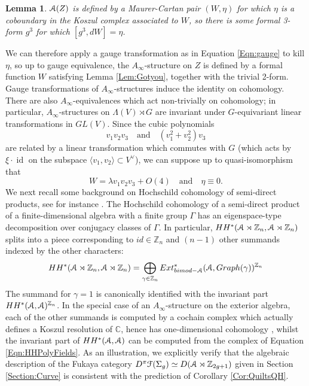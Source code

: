 \documentclass[reqno,10pt]{amsart}
\numberwithin{equation}{section}
\newcommand{\bC}{{\mathbb C}}
\newcommand{\bZ}{{\mathbb Z}}
\newcommand{\scrF}{\EuScript{F}}
\newcommand{\scrA}{\EuScript{A}}
\newcommand{\id}{\operatorname{id}}
\newtheorem{Lemma}[thm]{Lemma}
\theoremstyle{remark}
\begin{document}
 \begin{Lemma}
$\scrA(Z)$ is defined by a Maurer-Cartan pair $(W,\eta)$ for which $\eta$ is a coboundary in the Koszul complex associated to $W$, so there is some formal 3-form $g^3$ for which $[g^3,dW] = \eta$.
 \end{Lemma}

We can therefore apply a gauge transformation as in Equation \ref{Eqn:gauge}  to kill $\eta$, so up to gauge equivalence, the $A_{\infty}$-structure on $Z$ is defined by a formal function $W$ satisfying Lemma \ref{Lem:Gotyou}, together with the trivial 2-form. Gauge transformations of $A_{\infty}$-structures induce the identity on cohomology. There are also $A_{\infty}$-equivalences which act non-trivially on cohomology; in particular,  $A_{\infty}$-structures on $\Lambda(V)\rtimes G$ are invariant under $G$-equivariant linear transformations in $GL(V)$.  Since the cubic polynomials 
\[
v_1v_2v_3 \quad \textrm{and} \quad (v_1^2+v_2^2)v_3
\]
are related by a linear transformation which commutes with $G$ (which acts by $\xi \cdot \id$ on the subspace $\langle v_1, v_2\rangle \subset V^{\vee}$), we can suppose up to quasi-isomorphism that 
\begin{equation} \label{Eqn:MoreInfo}
W = \lambda v_1v_2v_3 + O(4) \quad \textrm{and} \quad \eta \equiv 0.
\end{equation}
 We next recall some background on Hochschild cohomology of semi-direct products, see for instance \cite{Shepler-Witherspoon}.  The Hochschild cohomology of a semi-direct product of a finite-dimensional algebra with a finite group $\Gamma$ has an eigenspace-type decomposition over conjugacy classes of $\Gamma$.  In particular, $HH^*(\scrA\rtimes \bZ_n, \scrA\rtimes \bZ_n)$ splits into a piece corresponding to $id \in \bZ_n$ and $(n-1)$ other summands indexed by the other characters:
\begin{equation} \label{Eqn:Characters}
HH^*(\scrA\rtimes \bZ_n, \scrA\rtimes \bZ_n) = \bigoplus_{\gamma \in \bZ_n} Ext_{bimod-\scrA}^*(\scrA, Graph(\gamma))^{\bZ_n} 
\end{equation}  The summand for $\gamma = 1$ is canonically identified with the invariant part $HH^*(\scrA,\scrA)^{\bZ_n}$. In the special case of an $A_{\infty}$-structure on the exterior algebra, each of the other summands is computed by a cochain complex which actually defines a Koszul resolution of $\bC$, hence has one-dimensional cohomology \cite[Section 4b]{Seidel:HMSquartic}, whilst the invariant part of $HH^*(\scrA,\scrA)$ can be computed from the complex of Equation \ref{Eqn:HHPolyFields}.
As an illustration, we explicitly verify that the algebraic description of the Fukaya category $D^{\pi}\scrF(\Sigma_g) \simeq D(\scrA\rtimes \bZ_{2g+1})$  given in Section \ref{Section:Curve} is consistent with the prediction of Corollary \ref{Cor:QuiltsQH}. 
\end{document}
